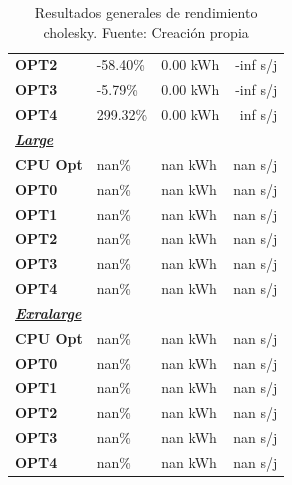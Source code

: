 \begin{table}[H]
\begin{tabular}{lllr}
    \cellcolor[HTML]{DAE8FC} \textbf{OPT2} & -58.40\%  &	0.00 kWh  &	-inf s/j \\
    \rowcolor[HTML]{EFEFEF} \cellcolor[HTML]{DAE8FC} \textbf{OPT3} &-5.79\%  &	0.00 kWh  &	-inf s/j \\
    \cellcolor[HTML]{DAE8FC} \textbf{OPT4} & 299.32\%  &	0.00 kWh  &	inf s/j \\
    \rowcolor[HTML]{EFEFEF} \cellcolor[HTML]{DAE8FC} \textbf{\textbf{{\emph{{\underline{{Large}}}}}}} &&	&	 \\
    \cellcolor[HTML]{DAE8FC} \textbf{CPU Opt} & nan\%  &	nan kWh  &	nan s/j \\
    \rowcolor[HTML]{EFEFEF} \cellcolor[HTML]{DAE8FC} \textbf{OPT0} &nan\%  &	nan kWh  &	nan s/j \\
    \cellcolor[HTML]{DAE8FC} \textbf{OPT1} & nan\%  &	nan kWh  &	nan s/j \\
    \rowcolor[HTML]{EFEFEF} \cellcolor[HTML]{DAE8FC} \textbf{OPT2} &nan\%  &	nan kWh  &	nan s/j \\
    \cellcolor[HTML]{DAE8FC} \textbf{OPT3} & nan\%  &	nan kWh  &	nan s/j \\
    \rowcolor[HTML]{EFEFEF} \cellcolor[HTML]{DAE8FC} \textbf{OPT4} &nan\%  &	nan kWh  &	nan s/j \\
    \cellcolor[HTML]{DAE8FC} \textbf{\textbf{{\emph{{\underline{{Exralarge}}}}}}} & &	&	 \\
    \rowcolor[HTML]{EFEFEF} \cellcolor[HTML]{DAE8FC} \textbf{CPU Opt} &nan\%  &	nan kWh  &	nan s/j \\
    \cellcolor[HTML]{DAE8FC} \textbf{OPT0} & nan\%  &	nan kWh  &	nan s/j \\
    \rowcolor[HTML]{EFEFEF} \cellcolor[HTML]{DAE8FC} \textbf{OPT1} &nan\%  &	nan kWh  &	nan s/j \\
    \cellcolor[HTML]{DAE8FC} \textbf{OPT2} & nan\%  &	nan kWh  &	nan s/j \\
    \rowcolor[HTML]{EFEFEF} \cellcolor[HTML]{DAE8FC} \textbf{OPT3} &nan\%  &	nan kWh  &	nan s/j \\
    \cellcolor[HTML]{DAE8FC} \textbf{OPT4} & nan\%  &	nan kWh  &	nan s/j \\
    \end{tabular}
    \caption[Resultados generales de rendimiento cholesky]{{Resultados generales de rendimiento cholesky. Fuente: Creación propia}}
    \label{table_global_cholesky_PowerResults_speedup-energy}
\end{table}